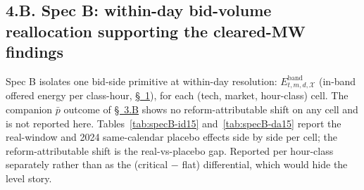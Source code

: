 \documentclass[11pt]{article}
\begin{document}
\vspace{10pt}

\subsection*{4.B. Spec B: within-day bid-volume reallocation supporting the cleared-MW findings}
\label{sec:4-specB}
Spec B isolates one bid-side primitive at within-day resolution: $E^{\text{band}}_{t,m,d,\mathcal{X}}$ (in-band offered energy per class-hour, \hyperref[sec:setup]{\S~1}), for each (tech, market, hour-class) cell. The companion $\bar p$ outcome of \hyperref[sec:smart_desc]{\S~3.B} shows no reform-attributable shift on any cell and is not reported here. Tables~\ref{tab:specB-id15} and~\ref{tab:specB-da15} report the real-window and 2024 same-calendar placebo effects side by side per cell; the reform-attributable shift is the real-vs-placebo gap. Reported per hour-class separately rather than as the (critical $-$ flat) differential, which would hide the level story.
\end{document}
